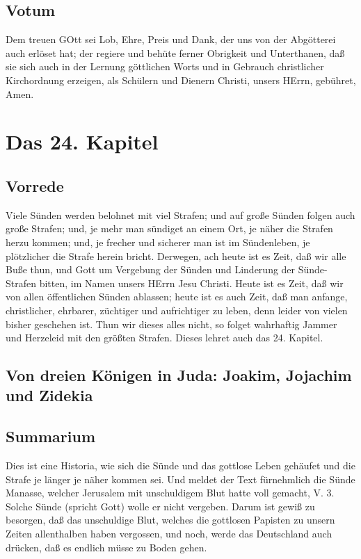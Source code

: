 \section{Votum}

Dem treuen GOtt sei Lob, Ehre, Preis und Dank, der uns von der Abgötterei auch erlöset hat; der regiere und behüte ferner Obrigkeit und Unterthanen, daß sie sich auch in der Lernung göttlichen Worts und in Gebrauch
 christlicher Kirchordnung erzeigen, als Schülern und Dienern Christi, unsers HErrn, gebühret, Amen.

\chapter{Das 24. Kapitel}

\section{Vorrede}

Viele Sünden werden belohnet mit viel Strafen; und auf große Sünden folgen auch große Strafen; und, je mehr man sündiget an einem Ort, je näher die Strafen herzu kommen; und, je frecher und sicherer man ist im Sündenleben, je plötzlicher die Strafe herein bricht. Derwegen, ach heute ist es Zeit, daß wir alle Buße thun, und Gott um Vergebung der Sünden und Linderung der Sünde-Strafen bitten, im Namen unsers HErrn Jesu Christi. Heute ist es Zeit, daß wir von allen öffentlichen Sünden ablassen; heute ist es auch Zeit, daß man anfange, christlicher, ehrbarer, züchtiger und aufrichtiger zu leben, denn leider von vielen bisher geschehen ist. Thun wir dieses alles nicht, so folget wahrhaftig Jammer und Herzeleid mit den größten Strafen. Dieses lehret auch das 24. Kapitel.

\section[Von dreien Königen in Juda: Joakim, Jojachim und]{Von dreien Königen in Juda: Joakim, Jojachim und Zidekia}

\section{Summarium}

Dies ist eine Historia, wie sich die Sünde und das gottlose Leben gehäufet und die Strafe je länger je näher kommen sei. Und meldet der Text fürnehmlich die Sünde Manasse, welcher Jerusalem mit unschuldigem Blut hatte voll gemacht, V. 3. Solche Sünde (spricht Gott) wolle er nicht vergeben. Darum ist gewiß zu besorgen, daß das unschuldige Blut, welches die gottlosen Papisten zu unsern Zeiten allenthalben haben vergossen, und noch, werde das Deutschland auch drücken, daß es endlich müsse zu Boden gehen.

